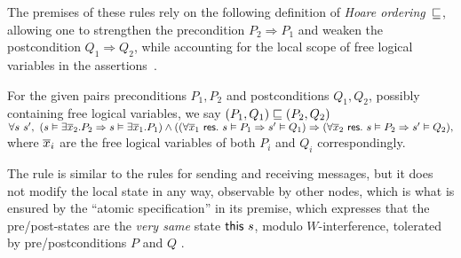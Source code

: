 The premises of these rules rely on the following definition of
\emph{Hoare ordering}~$\sqsubseteq$, allowing one to strengthen the
precondition $P_2 \Rightarrow P_1$ and weaken the postcondition
$Q_1 \Rightarrow Q_2$, while accounting for the local scope of free
logical variables in the assertions~\cite{Kleymann99}.
%
\begin{definition}
\label{def:hord}
For the given pairs preconditions $P_1,
P_2$ and postconditions $Q_1,
Q_2$, possibly containing free logical variables, we say $(P_1, Q_1)
\sqsubseteq (P_2, Q_2)$~\Iff~{\small$
\forall s~s',~(s \vDash \exists \overline{x}_2. P_2 \Rightarrow s \vDash
  \exists\overline{x}_1. P_1) \wedge
((\forall\overline{x}_1~\mathsf{res}.~s \vDash P_1 \Rightarrow s' \vDash Q_1)
  \Rightarrow
(\forall\overline{x}_2~\mathsf{res}.~s \vDash P_2 \Rightarrow s' \vDash Q_2),
$}
where $\overline{x}_i$ are the free logical variables of both $P_i$ and
$Q_i$ correspondingly.
\end{definition}


The rule  is similar to the rules for sending and receiving
messages, but it does not modify the local state in any way,
observable by other nodes, which is what is ensured by the ``atomic
specification'' in its premise, which expresses that the
pre/post-states are the \emph{very same} state $\mathsf{this}~{s}$, modulo
$W$-interference, tolerated by pre/postconditions $P$ and $Q$ .

